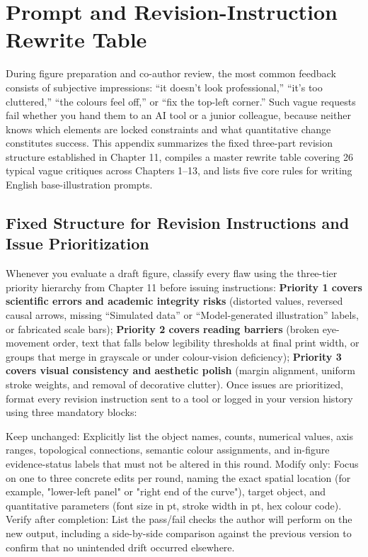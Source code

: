 \chapter{Prompt and Revision-Instruction Rewrite Table}
\label{app:prompt-rewrites}

During figure preparation and co-author review, the most common feedback consists of subjective impressions: ``it doesn't look professional,'' ``it's too cluttered,'' ``the colours feel off,'' or ``fix the top-left corner.'' Such vague requests fail whether you hand them to an AI tool or a junior colleague, because neither knows which elements are locked constraints and what quantitative change constitutes success. This appendix summarizes the fixed three-part revision structure established in Chapter 11, compiles a master rewrite table covering 26 typical vague critiques across Chapters 1--13, and lists five core rules for writing English base-illustration prompts.

\section{Fixed Structure for Revision Instructions and Issue Prioritization}

Whenever you evaluate a draft figure, classify every flaw using the three-tier priority hierarchy from Chapter 11 before issuing instructions: \textbf{Priority 1 covers scientific errors and academic integrity risks} (distorted values, reversed causal arrows, missing ``Simulated data'' or ``Model-generated illustration'' labels, or fabricated scale bars); \textbf{Priority 2 covers reading barriers} (broken eye-movement order, text that falls below legibility thresholds at final print width, or groups that merge in grayscale or under colour-vision deficiency); \textbf{Priority 3 covers visual consistency and aesthetic polish} (margin alignment, uniform stroke weights, and removal of decorative clutter). Once issues are prioritized, format every revision instruction sent to a tool or logged in your version history using three mandatory blocks:

\begin{Prompt}
Keep unchanged: Explicitly list the object names, counts, numerical values, axis ranges, topological connections, semantic colour assignments, and in-figure evidence-status labels that must not be altered in this round.
Modify only: Focus on one to three concrete edits per round, naming the exact spatial location (for example, "lower-left panel" or "right end of the curve"), target object, and quantitative parameters (font size in pt, stroke width in pt, hex colour code).
Verify after completion: List the pass/fail checks the author will perform on the new output, including a side-by-side comparison against the previous version to confirm that no unintended drift occurred elsewhere.
\end{Prompt}

